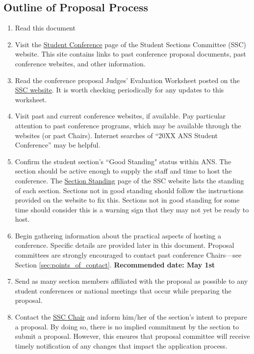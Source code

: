 \documentclass[12pt]{article}
\begin{document}
\subsection{Outline of Proposal Process}
\begin{enumerate}
\item{Read this document}
\item{Visit the \href{http://students.ans.org/student-conferences/}{Student Conference} page of the Student Sections Committee (SSC)
website. This site contains links to
past conference proposal documents, past conference websites, and other information.}
\item{Read the conference proposal Judges’ Evaluation Worksheet posted on the \href{http://students.ans.org/student-conferences/}{SSC website}. It is worth checking periodically for any updates to this worksheet.}
\item{Visit past and current conference websites, if available. Pay particular attention to past
conference programs, which may be available through the
websites (or past Chairs). Internet searches of ``20XX ANS Student Conference” may be helpful.}
\item{Confirm the student section's ``Good Standing" status within ANS. The section should be active enough to supply the staff and time to host the
conference. The \href{http://students.ans.org/section-standing/}{Section Standing} page of the SSC website lists the standing of each section. Sections not in good standing should follow the
instructions provided on the website to fix this. Sections not in good
standing for some time should consider this is a warning sign that they may not yet be ready to host.}
\item{Begin gathering information about the practical aspects of hosting a conference.
Specific details are provided later in this document. Proposal committees are strongly encouraged to contact past
conference Chairs---see Section \ref{sec:points_of_contact}. \textbf{Recommended date: May 1st}}
\item{Send as many section members affiliated with the proposal as possible to
any student conferences or national meetings that occur while preparing
the proposal.}
\item{Contact the \href{mailto:sscChair@gmail.com}{SSC Chair} and inform him/her of the section’s intent
to prepare a proposal. By doing so, there is no implied commitment by the
section to submit a proposal. However, this ensures that proposal committee will receive timely
notification of any changes that impact the application process.
}
\end{enumerate}
\end{document}
